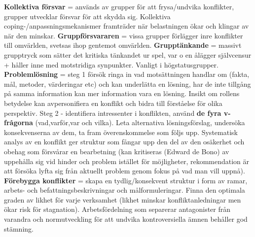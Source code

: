 \documentclass{report}
\begin{document}
	\textbf{Kollektiva försvar} = används av grupper för att
	frysa/undvika konflikter, grupper utvecklar försvar för att
	skydda sig. Kollektiva coping-/anpassningsmekanismer framträder
	när belastningen ökar och klingar av när den minskar.
	\textbf{Gruppförsvararen} = vissa grupper förlägger inre konflikter
	till omvärlden, svetsas ihop gentemot omvärlden. \textbf{Grupptänkande}
	= massivt grupptryck som sätter det kritiska tänkandet ur
	spel, var o en ålägger självcensur + håller inne med motstridiga
	synpunkter. Vanligt i högstatusgrupper. \textbf{Problemlösning}
	= steg 1 försök ringa in vad motsättningen handlar om (fakta,
	mål, metoder, värderingar etc) och kan underlätta en lösning,
	har de inte tillgång på samma information kan mer
	information vara en lösning. Insikt om rollens betydelse kan
	avpersonifiera en konflikt och bidra till förståelse för olika
	perspektiv. Steg 2 - identifiera intressenter i konflikten,
	använd \textbf{de fyra v-frågorna} (vad,varför,var och vilka).
	Leta alternativa lösningsförslag, undersöka konsekvenserna
	av dem, ta fram överenskommelse som följs upp. Systematisk
	analys av en konflikt ger struktur som fångar upp den del
	av den osäkerhet och obehag som försvårar en bearbetning (kan
	kritiseras (Edward de Bono) av uppehålla sig vid hinder och
	problem istället för möjligheter, rekommendation är att
	försöka lyfta sig från aktuellt problem genom fokus på vad
	man vill uppnå). \textbf{Förebygga konflikter} = skapa en tydlig/konsekvent
	struktur i form av ramar, arbets- och befattningsbeskrivningar
	och målformuleringar. Finna den optimala graden av likhet
	för varje verksamhet (likhet minskar konfliktanledningar men
	ökar risk för stagnation). Arbetsfördelning som separerar antagonister
	från varandra och normutveckling för att undvika kontroversiella
	ämnen behåller god stämning.
\end{document}
